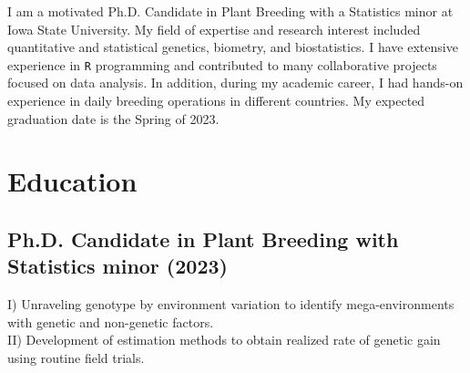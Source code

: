 \documentclass[]{mdkrause_cv_openfont}
\begin{document}
%
%

%
%

%
%

\begin{minipage}[t]{1\textwidth} 


\vspace{1 mm}

I am a motivated Ph.D. Candidate in Plant Breeding with a Statistics minor at Iowa State University. My field of expertise and research interest included quantitative and statistical genetics, biometry, and biostatistics. I have extensive experience in \texttt{R} programming and contributed to many collaborative projects focused on data analysis. In addition, during my academic career, I had hands-on experience in daily breeding operations in different countries. My expected graduation date is the Spring of 2023.



\section{Education} 


\subsection{Ph.D. Candidate in Plant Breeding with Statistics minor (2023)}
 I) Unraveling genotype by environment variation to identify mega-environments with genetic and non-genetic factors. \\ 
\hspace{1.55 cm} II) Development of estimation methods to obtain realized rate of genetic gain using routine field trials.


\end{minipage}
\end{document}
